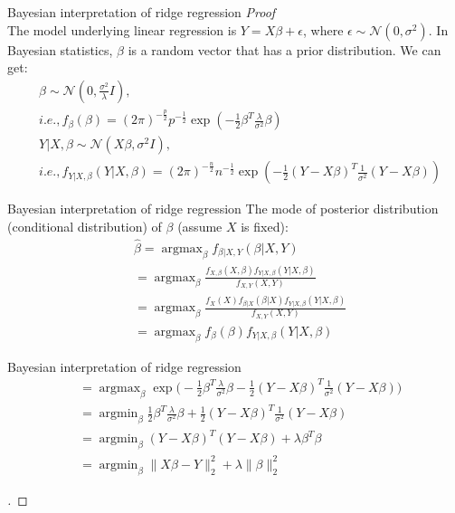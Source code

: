 \documentclass{beamer}
\begin{document}
	\begin{frame}{Bayesian interpretation of ridge regression}
		\textit{Proof} \\
		The model underlying linear regression is $Y=X\beta+\epsilon$, where $\epsilon \sim \mathcal{N}(0, \sigma^2)$. In Bayesian statistics, $\beta$ is a random vector that has a prior distribution. We can get:
		\begin{align*}
			&\beta \sim \mathcal{N}(0, \frac{\sigma^2}{\lambda} I), \\
			&i.e., f_\beta(\beta)=(2\pi)^{-\frac{p}{2}}p^{-\frac{1}{2}}\exp(-\frac{1}{2}\beta^T\frac{\lambda}{\sigma^2}\beta)\\
			&Y|X,\beta \sim \mathcal{N}(X\beta, \sigma^2I), \\
			&i.e., f_{Y|X,\beta}(Y|X,\beta)=(2\pi)^{-\frac{n}{2}}n^{-\frac{1}{2}}\exp(-\frac{1}{2}(Y-X\beta)^T\frac{1}{\sigma^2}(Y-X\beta))
		\end{align*}
	\end{frame}
	
	\begin{frame}{Bayesian interpretation of ridge regression}
		The mode of posterior distribution (conditional distribution) of $\beta$ (assume $X$ is fixed):
		\begin{align*}
			& \hat{\beta}=\mathop{\arg\max}_{\beta} f_{\beta|X,Y}(\beta|X,Y)\\
			&=\mathop{\arg\max}_{\beta} \frac{f_{X,\beta}(X,\beta)f_{Y|X,\beta}(Y|X,\beta)}{f_{X,Y}(X,Y)} \\
			&=\mathop{\arg\max}_{\beta} \frac{f_X(X)f_{\beta|X}(\beta|X)f_{Y|X,\beta}(Y|X,\beta)}{f_{X,Y}(X,Y)} \\
			&=\mathop{\arg\max}_{\beta} f_\beta(\beta)f_{Y|X,\beta}(Y|X,\beta)
		\end{align*}
	\end{frame}
	
	\begin{frame}{Bayesian interpretation of ridge regression}
		\begin{align*}
			&=\mathop{\arg\max}_{\beta} \exp \big(-\frac{1}{2}\beta^T\frac{\lambda}{\sigma^2}\beta-\frac{1}{2}(Y-X\beta)^T\frac{1}{\sigma^2}(Y-X\beta)\big) \\
			&=\mathop{\arg\min}_{\beta} \frac{1}{2}\beta^T\frac{\lambda}{\sigma^2}\beta+\frac{1}{2}(Y-X\beta)^T\frac{1}{\sigma^2}(Y-X\beta) \\
			&=\mathop{\arg\min}_{\beta} (Y-X\beta)^T(Y-X\beta) + \lambda \beta^T\beta \\
			&=\mathop{\arg\min}_{\beta} \|X\beta-Y\|_2^2 + \lambda \|\beta\|_2^2
		\end{align*}
		\begin{proof}[\unskip\nopunct]\end{proof}
	\end{frame}
	
\end{document}
